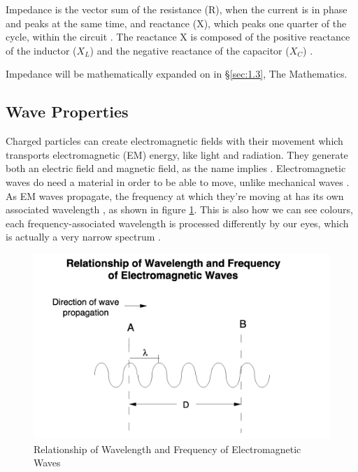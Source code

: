 \documentclass[12pt]{article}
\begin{document}
Impedance is the vector sum of the resistance (R), when the current is in phase and peaks at the same time, and reactance (X), which peaks one quarter of the cycle,
within the circuit
\cite{lionimpedance,isaacimpedance}.
The reactance X is composed of the positive reactance of the inductor ($X_L$) and the negative reactance of the capacitor ($X_C$)
\cite{isaacimpedance}.

Impedance will be mathematically expanded on in §\ref{sec:1.3}, The Mathematics.

\vspace{1cm}

\subsection{Wave Properties} \label{sec:1.2}

Charged particles can create electromagnetic fields with their movement which transports
electromagnetic (EM) energy, like light and radiation.
They generate both an electric field and magnetic field, as the name implies
\cite{NASAemwave}.
Electromagnetic waves do need a material in order to be able to move, unlike mechanical waves
\cite{NASAemwave}.
As EM waves propagate, the frequency at which they're moving at has its own associated wavelength
\cite{NASAemradio}, as shown in figure \ref{fig:emrelation}. 
This is also how we can see colours, each frequency-associated wavelength is processed differently by our eyes,
which is actually a very narrow spectrum
\cite{emcolour}.

\begin{figure}[H]
    \centering
    \includegraphics[width=15cm]{em wave relation.png}
    \caption{\centering \footnotesize{Relationship of Wavelength and Frequency of Electromagnetic Waves \protect\cite{NASAemradio}}}
    \label{fig:emrelation}
\end{figure}
\end{document}
